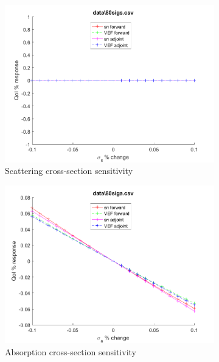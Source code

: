 \documentclass{article}
\begin{document}
\begin{figure}[H]
\begin{subfigure}{.5\textwidth}
  \includegraphics[width=.98\linewidth]{IanProposal/figures2/80sigsSens.png}
  \caption{Scattering cross-section sensitivity}
  \label{fig:sfig2}
\end{subfigure}%
\begin{subfigure}{.5\textwidth}
  \centering
  \includegraphics[width=.98\linewidth]{IanProposal/figures2/80sigaSens.png}
  \caption{Absorption cross-section sensitivity}
  \label{fig:sfig5}
\end{subfigure}%
\caption{}
\label{fig:fig}
\end{figure}
\newpage

\end{document}
